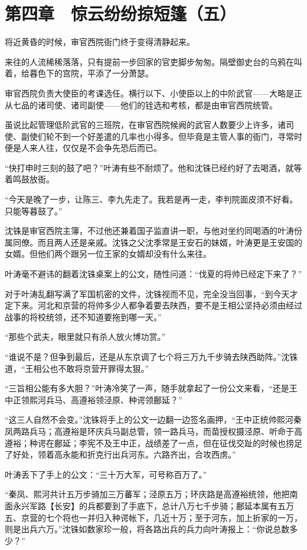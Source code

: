\section{第四章　惊云纷纷掠短篷（五）}

将近黄昏的时候，审官西院衙门终于变得清静起来。

来往的人流稀稀落落，只有提前一步回家的官吏脚步匆匆。隔壁御史台的乌鸦在叫着，给暮色下的宫院，平添了一分萧瑟。

审官西院负责大使臣的考课选任。横行以下、小使臣以上的中阶武官——大略是正从七品的诸司使、诸司副使——他们的铨选和考核，都是由审官西院统管。

虽说比起管理低阶武官的三班院，在审官西院候阙的武官人数要少上许多，诸司使、副使们轮不到一个好差遣的几率也小得多。但毕竟是主管人事的衙门，寻常时便是人来人往，仅仅是不会争先恐后而已。

“快打申时三刻的鼓了吧？”叶涛有些不耐烦了。他和沈铢已经约好了去喝酒，就等着鸣鼓放衙。

“今天是晚了一步，让陈三、李九先走了。我若是再一走，李判院面皮须不好看。只能等暮鼓了。”

沈铢是审官西院主簿，不过他还兼着国子监直讲一职，与他对坐约同喝酒的叶涛份属同僚。而且两人还是亲戚。沈铢之父沈季常是王安石的妹婿，叶涛更是王安国的女婿。但他们两个跟另一位王家的女婿却没有什么来往。

叶涛毫不避讳的翻着沈铢桌案上的公文，随性问道：“伐夏的将帅已经定下来了？”

对于叶涛乱翻写满了军国机密的文件，沈铢视而不见，完全没当回事，“到今天才定下来。河北和京营的将帅多少人都争着要去陕西，要不是王相公坚持必须由经过战事的将校统领，还不知道要拖到哪一天。”

“那些个武夫，眼里就只有杀人放火博功赏。”

“谁说不是？但争到最后，还是从东京调了七个将三万九千步骑去陕西助阵。”沈铢道，“王相公也不敢将京营开罪得太狠。”

“三旨相公能有多大胆？”叶涛冷笑了一声，随手就拿起了一份公文来看，“还是王中正领熙河兵马、高遵裕领泾原、种谔领鄜延？”

“这三人自然不会变。”沈铢将手上的公文一边翻一边签名画押，“王中正统帅熙河秦凤两路兵马；高遵裕是环庆兵马副总管，领一路兵马，而苗授权摄泾原、听命于高遵裕；种谔在鄜延；李宪不及王中正，战绩差了一点，但在征伐交趾的时候也捞足了好处，领着高永能和折克行出兵河东。六路齐出，合攻西虏。”

叶涛丢下了手上的公文：“三十万大军，可号称百万了。”

“秦凤、熙河共计五万步骑加三万蕃军；泾原五万；环庆路是高遵裕统领，他把南面永兴军路【长安】的兵都要到了手底下，总计八万七千步骑；鄜延本属有五万五、京营的七个将也一并归入种谔帐下，几近十万；至于河东，加上折家的一万，则是出兵六万。”沈铢如数家珍一般，将各路出兵的兵力向叶涛报上：“你说总数多少？”

